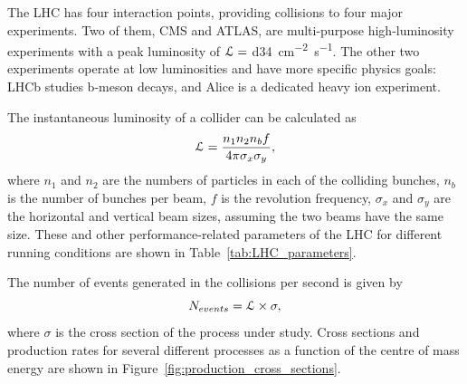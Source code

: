 The LHC has four interaction points, providing collisions to four major experiments. Two of them, CMS and ATLAS, are
multi-purpose high-luminosity experiments with a peak luminosity of $\mathcal{L} = $ \SI{d34}{\cm^{-2} s^{-1}}. The other two
experiments operate at low luminosities and have more specific physics goals: LHCb studies b-meson decays, and Alice is
a dedicated heavy ion experiment.

The instantaneous luminosity of a collider can be calculated as
\begin{equation}
	\mathcal{L} = \frac{n_1 n_2 n_b f}{4 \pi \sigma_x \sigma_y},
\end{equation}
where $n_1$ and $n_2$ are the numbers of particles in each of the colliding bunches, $n_b$ is the number of bunches per
beam, $f$ is the revolution frequency, $\sigma_x$ and $\sigma_y$ are the horizontal and vertical beam sizes, assuming
the two beams have the same size. These and other performance-related parameters of the LHC for different running
conditions are shown in Table~\ref{tab:LHC_parameters}.

The number of events generated in the collisions per second is given by
\begin{equation}
	N_{events} = \mathcal{L} \times \sigma,
\end{equation}
where $\sigma$ is the cross section of the process under study. Cross sections and production rates for several
different processes as a function of the centre of mass energy are shown in Figure~\ref{fig:production_cross_sections}.



